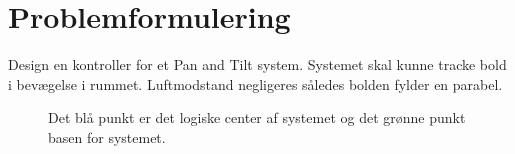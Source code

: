 \section{Problemformulering}
Design en kontroller for et Pan and Tilt system. Systemet skal kunne tracke bold i bevægelse i rummet.
Luftmodstand negligeres således bolden fylder en parabel.\\




\begin{figure}[!th]
\centering
\begin{tikzpicture}[scale=0.5]

\end{tikzpicture}
\caption[Skematisk tegning af Pan and Tilt]{Det blå punkt er det logiske center af systemet og det grønne punkt basen for systemet.}
\label{fig:}
\end{figure}